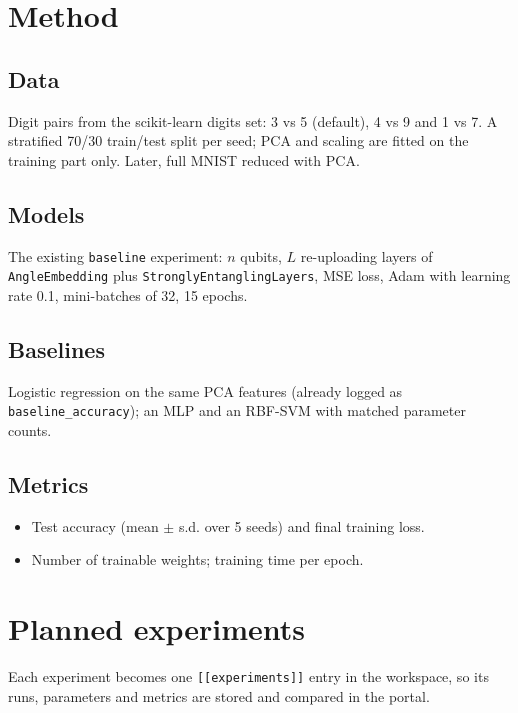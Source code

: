 \documentclass[11pt,a4paper]{article}
\begin{document}
\section{Method}
\subsection{Data}
Digit pairs from the scikit-learn digits set: 3 vs 5 (default), 4 vs 9 and 1 vs 7. A stratified
70/30 train/test split per seed; PCA and scaling are fitted on the training part only. Later, full
MNIST reduced with PCA.

\subsection{Models}
The existing \texttt{baseline} experiment: $n$ qubits, $L$ re-uploading layers of
\texttt{AngleEmbedding} plus \texttt{StronglyEntanglingLayers}, MSE loss, Adam with learning rate 0.1,
mini-batches of 32, 15 epochs.

\subsection{Baselines}
Logistic regression on the same PCA features (already logged as \texttt{baseline\_accuracy});
an MLP and an RBF-SVM with matched parameter counts.

\subsection{Metrics}
\begin{itemize}
  \item Test accuracy (mean $\pm$ s.d. over 5 seeds) and final training loss.
  \item Number of trainable weights; training time per epoch.
\end{itemize}

\section{Planned experiments}
Each experiment becomes one \texttt{[[experiments]]} entry in the workspace, so its runs, parameters
and metrics are stored and compared in the portal.
\end{document}
